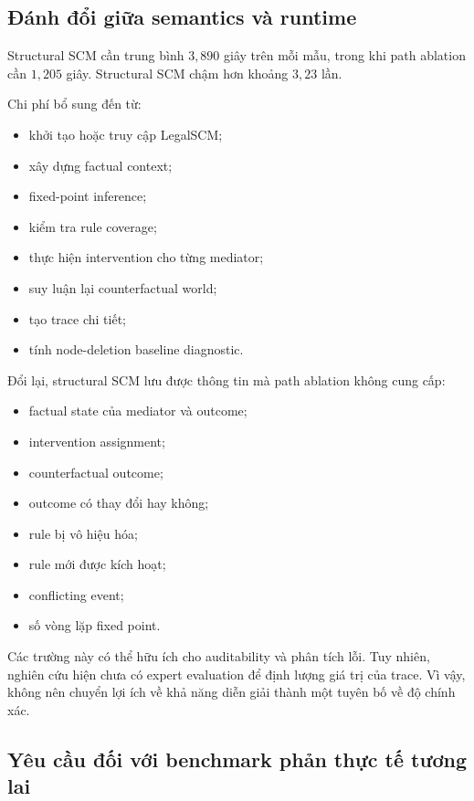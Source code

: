 \subsection{Đánh đổi giữa semantics và runtime}

Structural SCM cần trung bình \(3{,}890\) giây trên mỗi mẫu, trong khi path
ablation cần \(1{,}205\) giây. Structural SCM chậm hơn khoảng \(3{,}23\) lần.

Chi phí bổ sung đến từ:

\begin{itemize}
    \item khởi tạo hoặc truy cập LegalSCM;
    \item xây dựng factual context;
    \item fixed-point inference;
    \item kiểm tra rule coverage;
    \item thực hiện intervention cho từng mediator;
    \item suy luận lại counterfactual world;
    \item tạo trace chi tiết;
    \item tính node-deletion baseline diagnostic.
\end{itemize}

Đổi lại, structural SCM lưu được thông tin mà path ablation không cung cấp:

\begin{itemize}
    \item factual state của mediator và outcome;
    \item intervention assignment;
    \item counterfactual outcome;
    \item outcome có thay đổi hay không;
    \item rule bị vô hiệu hóa;
    \item rule mới được kích hoạt;
    \item conflicting event;
    \item số vòng lặp fixed point.
\end{itemize}

Các trường này có thể hữu ích cho auditability và phân tích lỗi. Tuy nhiên,
nghiên cứu hiện chưa có expert evaluation để định lượng giá trị của trace.
Vì vậy, không nên chuyển lợi ích về khả năng diễn giải thành một tuyên bố về
độ chính xác.

\subsection{Yêu cầu đối với benchmark phản thực tế tương lai}

